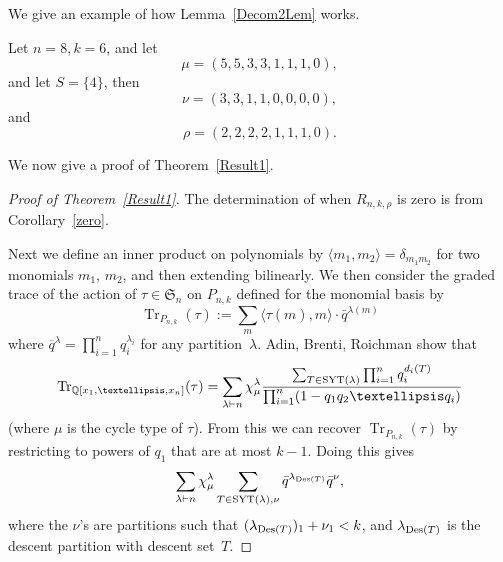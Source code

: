 \documentclass[10pt]{article}
\newcommand{\coloneqq}{:=}
\newcommand{\Tr}{\operatorname{Tr}}\newcommand{\rev}{\operatorname{rev}}
\begin{document}
We give an example of how Lemma~\ref{Decom2Lem} works.

\begin{exam}

	Let $n=8,k=6$, and let
\begin{equation}
\mu=(5,5,3,3,1,1,1,0),
\end{equation}
and let $S=\{4\}$, 
then
\begin{equation}
\nu=(3,3,1,1,0,0,0,0),
\end{equation}
and
\begin{equation}
\rho=(2,2,2,2,1,1,1,0).
\end{equation}
\end{exam}


We now give a proof of Theorem~\ref{Result1}.
	\begin{proof}[Proof of Theorem~\ref{Result1}]
		The determination of when $R_{n,k,\rho}$ is zero is from Corollary~\ref{zero}.
		
		Next we define an inner product on polynomials by $\langle m_1, m_2 \rangle=\delta_{m_1m_2}$ for two monomials $m_1$, 
$m_2$, and then extending bilinearly.
		 We then consider the graded trace of the action of $\tau\in \mathfrak{S}_n$ on $P_{n,k}$ defined for the monomial 
basis by
\begin{equation}
\Tr _{P_{n,k}}(\tau)\coloneqq \sum_m \langle \tau(m),m\rangle \cdot 
\bar{q}^{\lambda(m)}
\end{equation}
where $\overline{q}^{\lambda}=\prod_{i=1}^n q_i^{\lambda_i}$ for any partition~$\lambda$. Adin, Brenti, Roichman show that
\begin{equation}
\Tr_{\mathbb{Q}[x_1,\ldots, x_n]}(\tau)=\sum_{\lambda\vdash n} \chi^\lambda_\mu\frac{\sum_{T\in \SYT (\lambda)} 
\prod_{i=1}^n q_i^{d_i(T)}}{\prod_{i=1}^n (1-q_1q_2\ldots q_i)}
\end{equation}
(where $\mu$ is the cycle type of $\tau$).
From this we can recover $\Tr _{P_{n,k}}(\tau)$ by restricting to powers of $q_1$ that are at most $k-1$. Doing this 
gives
\begin{equation}
\sum_{\lambda\vdash n}\chi_\mu^\lambda\sum_{T\in 
\operatorname{SYT} (\lambda),\nu}\bar{q}^{\lambda_{\operatorname{Des} (T)}}\bar{q}^\nu,
\end{equation}
 where the $\nu$'s are partitions such that 
$(\lambda_{\operatorname{Des} (T)})_1+\nu_1<k$, and $\lambda_{\operatorname{Des} (T)}$ is the descent partition with descent set~$T$.


\end{proof}
\end{document}
